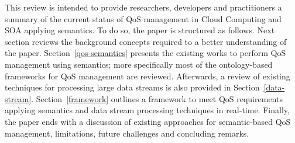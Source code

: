 This review is intended to provide researchers, developers and practitioners a summary of the current status of QoS management in Cloud Computing and SOA applying semantics. To do so, the paper 
is structured as follows. Next section reviews the background concepts required to a better understanding of the paper. Section~\ref{qos-semantics} 
presents the existing works to perform QoS management using semantics; more specifically most of the ontology-based frameworks for 
QoS management are reviewed. Afterwards, a review of existing techniques for processing large data streams is also provided in Section~\ref{data-stream}. 
Section~\ref{framework} outlines a framework to meet QoS requirements applying semantics and data stream processing techniques in real-time. 
Finally, the paper ends with a discussion of existing approaches for semantic-based QoS management, 
limitations, future challenges and concluding remarks. 

